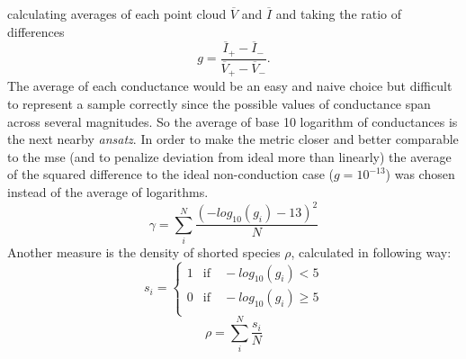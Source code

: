 calculating averages of each point cloud $\overline{V}$ and $\overline{I}$ and taking the ratio of differences 
\begin{equation}
    g = \frac{\overline{I}_{+} - \overline{I}_-}{\overline{V}_{+} - \overline{V}_-}.
\end{equation}
%
The average of each conductance would be an easy and naive choice but difficult to represent a 
sample correctly since the possible values of conductance span across several magnitudes.
So the average of base 10 logarithm of conductances is the next nearby \textit{ansatz}.
%
In order to make the metric closer and better comparable to the \gls{mse} (and to penalize deviation from ideal more than linearly) the average of the squared difference 
to the ideal non-conduction case ($g=10^{-13}$) was chosen instead of the average of logarithms. 
%
\begin{equation}
    \gamma = \sum_i^N \frac{ (-log_{10}(g_i) - 13)^2}{N}
	\label{eq:gamma}
\end{equation}
Another measure is the density of shorted species $\rho$, calculated in following way:
\begin{equation}
	s_i = \begin{cases}
        1 &\text{if} \quad -log_{10}(g_i) < 5 \\
        0 &\text{if} \quad -log_{10}(g_i) \geq 5 \\
	\end{cases}
\end{equation}
\begin{equation}
	\rho = \sum_i^N \frac{s_i}{N}
	\label{eq:rho}
\end{equation}
%

